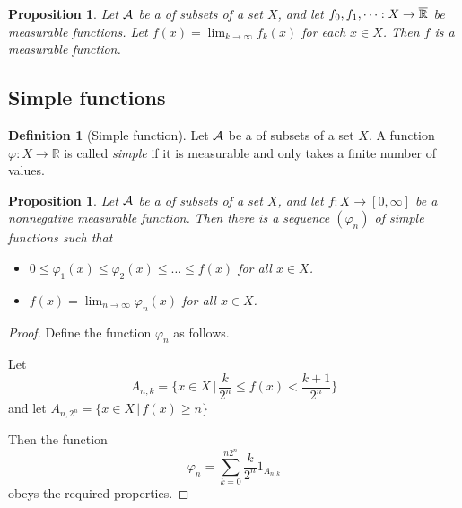 \documentclass[10pt, oneside, reqno]{amsart}
\theoremstyle{plain}%
\newtheorem{prop}[thm]{Proposition}
\theoremstyle{definition}
\newtheorem{defn}[thm]{Definition}
\theoremstyle{remark}
\newcommand{\given}{ \, | \,}
\newcommand{\R}{\mathbb{R}}
\renewcommand{\phi}{\varphi}
\begin{document}
\begin{prop}
	Let $\mathcal{A}$ be a \sig of subsets of a set $X$, and let $f_0, f_1,\dots : X \rightarrow \Rbar$ be measurable functions.  Let $f(x) = \lim_{k \rightarrow \infty} f_k(x)$ for each $x \in X$. Then $f$ is a measurable function.
\end{prop}  




\subsection{Simple functions} %
\label{sub:simple_functions}
\begin{defn}[Simple function]

	Let $\mathcal{A}$ be a \sig of subsets of a set $X$.  A function $\phi : X \rightarrow \R$ is called \emph{simple} if it is measurable and only takes a finite number of values.
\end{defn}


\begin{prop}
	Let $\mathcal{A}$ be a \sig of subsets of a set $X$, and let $f: X \rightarrow [0, \infty]$ be a nonnegative measurable function.  Then there is a sequence $(\phi_n)$ of simple functions such that 
	\begin{itemize}
		\item $0 \leq \phi_1(x) \leq \phi_2(x) \leq \dots \leq f(x)$ for all $x \in X$.
		\item $f(x) = \lim_{n \rightarrow \infty} \phi_n(x)$ for all $x \in X$.
	\end{itemize}
\end{prop}

\begin{proof}
	Define the function $\phi_n$ as follows.
	
	Let \[
		A_{n,k} = \{ x \in X \given \frac{k}{2^n} \leq f(x) < \frac{k+1}{2^n} \}
	\]
	and let $A_{n,2^n} = \{ x \in X \given f(x) \geq n \}$
	
	Then the function \[
		\phi_n  = \sum_{k=0}^{n2^n} \frac{k}{2^n}1_{A_{n,k}}
	\]
	obeys the required properties.
\end{proof}
\end{document}
